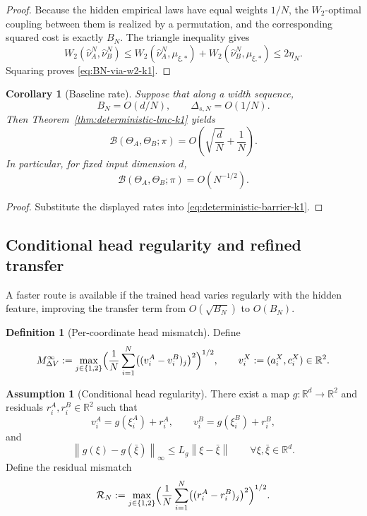 \documentclass[11pt]{article}
\newtheorem{corollary}[theorem]{Corollary}
\theoremstyle{definition}
\newtheorem{definition}[theorem]{Definition}
\newtheorem{assumption}[theorem]{Assumption}
\newcommand{\R}{\mathbb{R}}
\newcommand{\norm}[1]{\left\lVert #1 \right\rVert}
\newcommand{\mc}[1]{\mathcal{#1}}
\newcommand{\cB}{\mathcal{B}}
\begin{document}
\begin{proof}
Because the hidden empirical laws have equal weights $1/N$, the $W_2$-optimal
coupling between them is realized by a permutation, and the corresponding
squared cost is exactly $B_N$. The triangle inequality gives
\[
  W_2(\hat\nu_A^N,\hat\nu_B^N)
  \le
  W_2(\hat\nu_A^N,\mu_{\xi,\ast}) + W_2(\hat\nu_B^N,\mu_{\xi,\ast})
  \le
  2\eta_N.
\]
Squaring proves \eqref{eq:BN-via-w2-k1}.
\end{proof}

\begin{corollary}[Baseline rate]
\label{cor:baseline-rate-k1}
Suppose that along a width sequence,
\[
  B_N=O(d/N),
  \qquad
  \Delta_{s,N}=O(1/N).
\]
Then Theorem~\ref{thm:deterministic-lmc-k1} yields
\[
  \cB(\Theta_A,\Theta_B;\pi)
  =
  O\!\left(\sqrt{\frac{d}{N}}+\frac1N\right).
\]
In particular, for fixed input dimension $d$,
\[
  \cB(\Theta_A,\Theta_B;\pi)=O(N^{-1/2}).
\]
\end{corollary}

\begin{proof}
Substitute the displayed rates into \eqref{eq:deterministic-barrier-k1}.
\end{proof}

\subsection{Conditional head regularity and refined transfer}

A faster route is available if the trained head varies regularly with the
hidden feature, improving the transfer term from $O(\sqrt{B_N})$ to $O(B_N)$.

\begin{definition}[Per-coordinate head mismatch]
\label{def:head-mismatch-k1}
Define
\[
  M_{\Delta V}^\infty
  :=
  \max_{j\in\{1,2\}}
  \Bigl(
    \frac1N\sum_{i=1}^N \bigl((v_i^A-v_i^B)_j\bigr)^2
  \Bigr)^{1/2},
  \qquad
  v_i^X:=(a_i^X,c_i^X)\in\R^2.
\]
\end{definition}

\begin{assumption}[Conditional head regularity]
\label{ass:head-regularity-k1}
There exist a map $g:\R^d\to\R^2$ and residuals $r_i^A,r_i^B\in\R^2$ such that
\[
  v_i^A=g(\xi_i^A)+r_i^A,
  \qquad
  v_i^B=g(\xi_i^B)+r_i^B,
\]
and
\[
  \norm{g(\xi)-g(\bar\xi)}_\infty
  \le
  L_g\norm{\xi-\bar\xi}
  \qquad
  \forall \xi,\bar\xi\in\R^d.
\]
Define the residual mismatch
\[
  \mc{R}_N
  :=
  \max_{j\in\{1,2\}}
  \Bigl(
    \frac1N\sum_{i=1}^N \bigl((r_i^A-r_i^B)_j\bigr)^2
  \Bigr)^{1/2}.
\]
\end{assumption}
\end{document}
